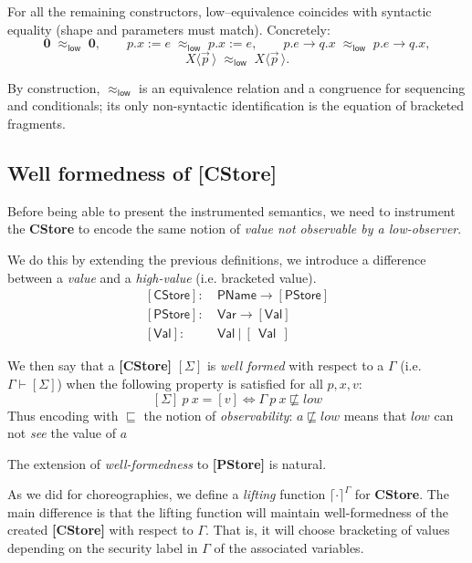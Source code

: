 \documentclass[12pt,a4paper,twoside]{book}
\begin{document}
\noindent For all the remaining constructors, low–equivalence coincides with syntactic equality (shape and parameters must match). Concretely:
\[
\boldsymbol{0} \;\approx_{\mathsf{low}}\; \boldsymbol{0},\qquad
p.x \mathrel{:=} e \;\approx_{\mathsf{low}}\; p.x \mathrel{:=} e,\qquad
p.e \rightarrow q.x \;\approx_{\mathsf{low}}\; p.e \rightarrow q.x,
\]
\[
X\langle \vec{p}\,\rangle \;\approx_{\mathsf{low}}\; X\langle \vec{p}\,\rangle.
\]

By construction, \(\approx_{\mathsf{low}}\) is an equivalence relation and a congruence
for sequencing and conditionals; its only non-syntactic identification is the equation of  bracketed fragments.

\subsection{Well formedness of \textbf{[CStore]}}
Before being able to present the instrumented semantics, we need to instrument the \textbf{CStore} to encode the same notion of \emph{value not observable by a low-observer}.

We do this by extending the previous definitions, we introduce a difference between a \emph{value} and a \emph{high-value} (i.e. bracketed value).
\begin{align*}
	\mathsf{[CStore]}:&~\mathsf{PName} \rightarrow \mathsf{[PStore]}\\
	\mathsf{[PStore]}:&~\mathsf{Var} \rightarrow \mathsf{[Val]}\\
	\mathsf{[Val]}:&~ \mathsf{Val}~|~[~~\mathsf{Val}~~]
\end{align*}

We then say that a \textbf{[CStore]} $[\Sigma]$ is \emph{well formed} with respect to a $\Gamma$ (i.e. $\Gamma \vdash [\Sigma]$) when the following property is satisfied for all $p, x, v$:
$$
	[\Sigma]~p~x = [v] \iff \Gamma~p~x \not\sqsubseteq low
$$
Thus encoding with $\sqsubseteq$ the notion of \emph{observability}: $a \not\sqsubseteq low$ means that $low$ can not \emph{see} the value of $a$

The extension of \emph{well-formedness} to \textbf{[PStore]} is natural.

As we did for choreographies, we define a \emph{lifting} function $\lceil \cdot \rceil^\Gamma$ for \textbf{CStore}. The main difference is that the lifting function will maintain well-formedness of the created \textbf{[CStore]} with respect to $\Gamma$. That is, it will choose bracketing of values depending on the security label in $\Gamma$ of the associated variables.
\end{document}

